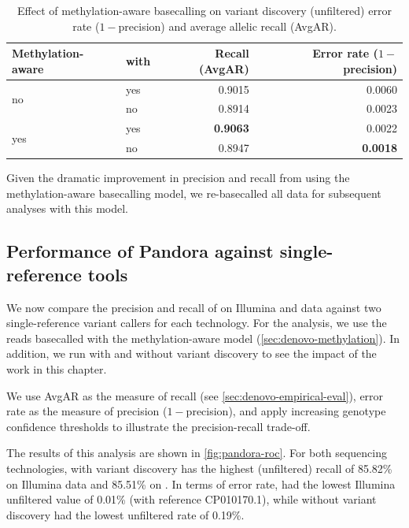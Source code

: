 \begin{table}
\centering
\begin{tabular}{@{}llrr@{}}
\toprule
    Methylation-aware    & with \denovo{} & Recall (AvgAR)  & Error rate ($1-$precision) \\ \midrule
\multirow{2}{*}{no}  & yes                   & 0.9015          & 0.0060                   \\
                     & no                    & 0.8914          & 0.0023                   \\
\multirow{2}{*}{yes} & yes                   & \textbf{0.9063} & 0.0022                   \\
                     & no                    & 0.8947          & \textbf{0.0018}          \\ \cmidrule(l){2-4} 
\end{tabular}
    \caption{Effect of \ont{} methylation-aware basecalling on \pandora{} \denovo{} variant discovery (unfiltered) error rate ($1-$precision) and average allelic recall (AvgAR).}
\label{tab:denovo-methylation}
\end{table}

\noindent
Given the dramatic improvement in precision and recall from using the methylation-aware basecalling model, we re-basecalled all data for subsequent analyses with this model.

\subsection{Performance of Pandora against single-reference tools}
\label{sec:pandora-roc-results}

We now compare the precision and recall of \pandora{} on Illumina and \ont{} data against two single-reference variant callers for each technology. For the \ont{} analysis, we use the reads basecalled with the methylation-aware model (\autoref{sec:denovo-methylation}). In addition, we run \pandora{} with and without \denovo{} variant discovery to see the impact of the work in this chapter.

We use AvgAR as the measure of recall (see \autoref{sec:denovo-empirical-eval}), error rate as the measure of precision ($1-$precision), and apply increasing genotype confidence thresholds to illustrate the precision-recall trade-off. 

The results of this analysis are shown in \autoref{fig:pandora-roc}. For both sequencing technologies, \pandora{} with \denovo{} variant discovery has the highest (unfiltered) recall of 85.82\% on Illumina data and 85.51\% on \ont{}. In terms of error rate,  had the lowest Illumina unfiltered value of 0.01\% (with reference CP010170.1), while \pandora{} without \denovo{} variant discovery had the lowest \ont{} unfiltered rate of 0.19\%. 

